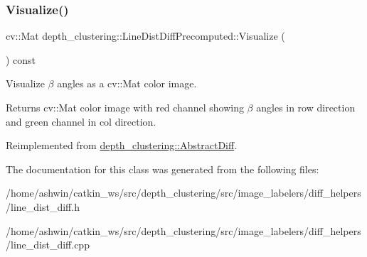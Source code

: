 \subsubsection{\texorpdfstring{Visualize()}{Visualize()}}
{\footnotesize\ttfamily cv\+::\+Mat depth\+\_\+clustering\+::\+Line\+Dist\+Diff\+Precomputed\+::\+Visualize (\begin{DoxyParamCaption}{ }\end{DoxyParamCaption}) const\hspace{0.3cm}{\ttfamily [virtual]}}



Visualize $\beta$ angles as a {\ttfamily cv\+::\+Mat} color image. 

\begin{DoxyReturn}{Returns}
{\ttfamily cv\+::\+Mat} color image with red channel showing $\beta$ angles in row direction and green channel in col direction. 
\end{DoxyReturn}


Reimplemented from \hyperlink{classdepth__clustering_1_1AbstractDiff_a45314bf711f35e53590af28bdfc45313}{depth\+\_\+clustering\+::\+Abstract\+Diff}.



The documentation for this class was generated from the following files\+:\begin{DoxyCompactItemize}
\item 
/home/ashwin/catkin\+\_\+ws/src/depth\+\_\+clustering/src/image\+\_\+labelers/diff\+\_\+helpers/line\+\_\+dist\+\_\+diff.\+h\item 
/home/ashwin/catkin\+\_\+ws/src/depth\+\_\+clustering/src/image\+\_\+labelers/diff\+\_\+helpers/line\+\_\+dist\+\_\+diff.\+cpp\end{DoxyCompactItemize}
